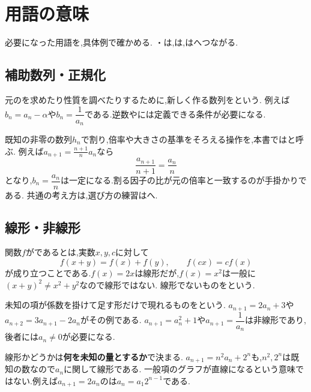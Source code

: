 
\section{用語の意味}\label{節：用語解説}
  必要になった用語を,具体例で確かめる.
  ・は,は,はへつながる.

  \subsection{補助数列・正規化}\label{節：補助数列・正規化}
    元のを求めたり性質を調べたりするために,新しく作る数列を\textbf{}という.
    例えば$b_n=a_n-\alpha$や$b_n=\dfrac{1}{a_n}$である.逆数やには定義できる条件が必要になる.

    既知の非零の数列$h_n$で割り,倍率や大きさの基準をそろえる操作を,本書では\textbf{}と呼ぶ.
    例えば$a_{n+1}=\frac{n+1}{n}a_n$なら
    \[
      \frac{a_{n+1}}{n+1}=\frac{a_n}{n}
    \]
    となり,$b_n=\dfrac{a_n}{n}$は一定になる.割る因子の比が元の倍率と一致するのが手掛かりである.
    共通の考え方は,選び方の練習はへ.

  \subsection{線形・非線形}\label{節：線形・非線形}
    関数$f$が\textbf{}であるとは,実数$x,y,c$に対して
    \[
      f(x+y)=f(x)+f(y),\qquad f(cx)=cf(x)
    \]
    が成り立つことである.$f(x)=2x$は線形だが,$f(x)=x^2$は一般に$(x+y)^2\ne x^2+y^2$なので線形ではない.
    線形でないものを\textbf{}という.

    未知の項が係数を掛けて足す形だけで現れるものを\textbf{}という.
    $a_{n+1}=2a_n+3$や$a_{n+2}=3a_{n+1}-2a_n$がその例である.
    $a_{n+1}=a_n^2+1$や$a_{n+1}=\dfrac{1}{a_n}$は非線形であり,後者には$a_n\ne0$が必要になる.

    線形かどうかは\textbf{何を未知の量とするか}で決まる.
    $a_{n+1}=n^2a_n+2^n$も,$n^2,2^n$は既知の数なので$a_n$に関して線形である.
    一般項のグラフが直線になるという意味ではない.例えば$a_{n+1}=2a_n$のは$a_n=a_1 2^{n-1}$である.

